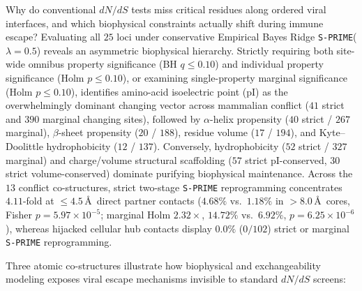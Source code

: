 \documentclass[11pt,letterpaper]{article}
\newcommand{\SPRIME}{\texttt{S-PRIME}\xspace}
\begin{document}
Why do conventional $dN/dS$ tests miss critical residues along ordered viral interfaces, and which biophysical constraints actually shift during immune escape? Evaluating all $25$ loci under conservative Empirical Bayes Ridge \SPRIME ($\lambda = 0.5$) reveals an asymmetric biophysical hierarchy. Strictly requiring both site-wide omnibus property significance (BH $q \le 0.10$) and individual property significance (Holm $p \le 0.10$), or examining single-property marginal significance (Holm $p \le 0.10$), identifies amino-acid isoelectric point ($\text{pI}$) as the overwhelmingly dominant changing vector across mammalian conflict ($41$ strict and $390$ marginal changing sites), followed by $\alpha$-helix propensity ($40$ strict / $267$ marginal), $\beta$-sheet propensity ($20$ / $188$), residue volume ($17$ / $194$), and Kyte--Doolittle hydrophobicity ($12$ / $137$). Conversely, hydrophobicity ($52$ strict / $327$ marginal) and charge/volume structural scaffolding ($57$ strict $\text{pI}$-conserved, $30$ strict volume-conserved) dominate purifying biophysical maintenance. Across the $13$ conflict co-structures, strict two-stage \SPRIME reprogramming concentrates $4.11$-fold at $\le 4.5$\,\AA\ direct partner contacts ($4.68\%$ vs.\ $1.18\%$ in $>8.0$\,\AA\ cores, Fisher $p = 5.97 \times 10^{-5}$; marginal Holm $2.32\times$, $14.72\%$ vs.\ $6.92\%$, $p = 6.25 \times 10^{-6}$), whereas hijacked cellular hub contacts display $0.0\%$ ($0/102$) strict or marginal \SPRIME reprogramming.

Three atomic co-structures illustrate how biophysical and exchangeability modeling exposes viral escape mechanisms invisible to standard $dN/dS$ screens:
\end{document}
